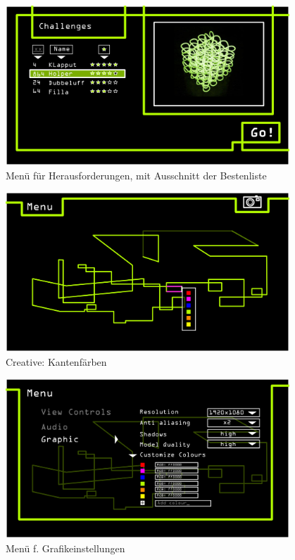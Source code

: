 	\begin{figure}[ht]
	  \centering
	  \includegraphics[width = 0.95\textwidth]{Systemmodelle/04_Knot3-select-Challenge.png}
	  \caption{Menü für Herausforderungen, mit Ausschnitt der Bestenliste}
	\end{figure}
	
	\begin{figure}[ht]
	  \centering
	  \includegraphics[width = 0.95\textwidth]{Systemmodelle/05_Knot3-Colour-select.png}
	  \caption{Creative: Kantenfärben}
	\end{figure}
	
	\begin{figure}[ht]
	  \centering
	  \includegraphics[width = 0.95\textwidth]{Systemmodelle/08_Knot3-menu-graphics.png}
	  \caption{Menü f. Grafikeinstellungen}
	\end{figure}

